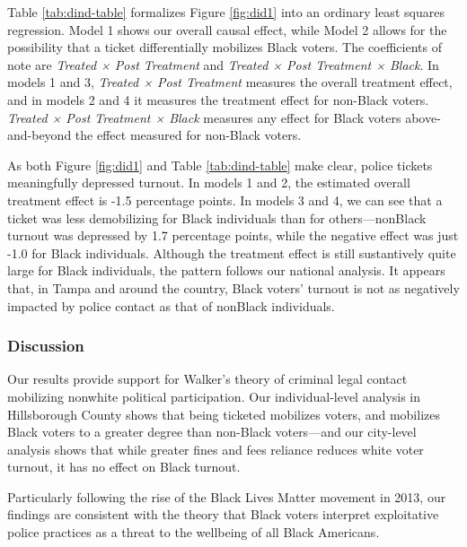 \documentclass[
  12pt,
]{article}
\begin{document}
Table \ref{tab:dind-table} formalizes Figure \ref{fig:did1} into an ordinary least squares regression. Model 1 shows our overall causal effect, while Model 2 allows for the possibility that a ticket differentially mobilizes Black voters. The coefficients of note are \emph{Treated × Post Treatment} and \emph{Treated × Post Treatment × Black}. In models 1 and 3, \emph{Treated × Post Treatment} measures the overall treatment effect, and in models 2 and 4 it measures the treatment effect for non-Black voters. \emph{Treated × Post Treatment × Black} measures any effect for Black voters above-and-beyond the effect measured for non-Black voters.

\begin{singlespace}

\end{singlespace}

As both Figure \ref{fig:did1} and Table \ref{tab:dind-table} make clear, police tickets meaningfully depressed turnout. In models 1 and 2, the estimated overall treatment effect is -1.5 percentage points. In models 3 and 4, we can see that a ticket was less demobilizing for Black individuals than for others---nonBlack turnout was depressed by 1.7 percentage points, while the negative effect was just -1.0 for Black individuals. Although the treatment effect is still sustantively quite large for Black individuals, the pattern follows our national analysis. It appears that, in Tampa and around the country, Black voters' turnout is not as negatively impacted by police contact as that of nonBlack individuals.

\hypertarget{discussion}{%
\subsubsection*{Discussion}\label{discussion}}

Our results provide support for Walker's theory of criminal legal contact mobilizing nonwhite political participation. Our individual-level analysis in Hillsborough County shows that being ticketed mobilizes voters, and mobilizes Black voters to a greater degree than non-Black voters---and our city-level analysis shows that while greater fines and fees reliance reduces white voter turnout, it has no effect on Black turnout.

Particularly following the rise of the Black Lives Matter movement in 2013, our findings are consistent with the theory that Black voters interpret exploitative police practices as a threat to the wellbeing of all Black Americans.
\end{document}
